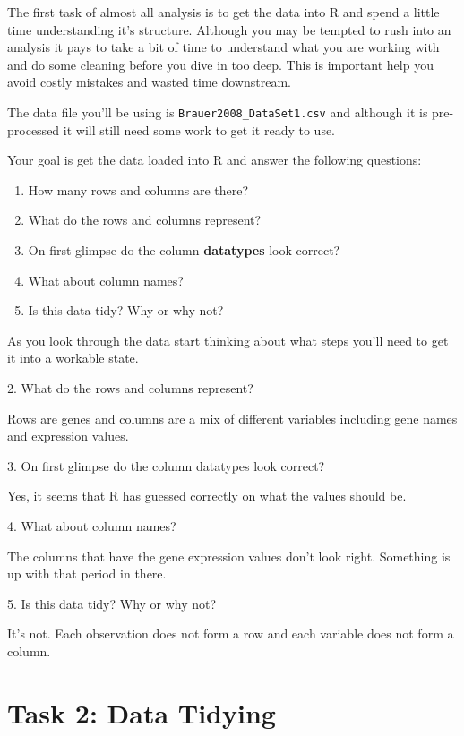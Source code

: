 \documentclass[
]{book}
\providecommand{\tightlist}{%
  \setlength{\itemsep}{0pt}\setlength{\parskip}{0pt}}
\begin{document}
The first task of almost all analysis is to get the data into R and spend a little time understanding it's structure. Although you may be tempted to rush into an analysis it pays to take a bit of time to understand what you are working with and do some cleaning before you dive in too deep. This is important help you avoid costly mistakes and wasted time downstream.

The data file you'll be using is \texttt{Brauer2008\_DataSet1.csv} and although it is pre-processed it will still need some work to get it ready to use.

Your goal is get the data loaded into R and answer the following questions:

\begin{enumerate}
\def\labelenumi{\arabic{enumi}.}
\tightlist
\item
  How many rows and columns are there?
\item
  What do the rows and columns represent?
\item
  On first glimpse do the column \textbf{datatypes} look correct?
\item
  What about column names?
\item
  Is this data tidy? Why or why not?
\end{enumerate}

As you look through the data start thinking about what steps you'll need to get it into a workable state.

2. What do the rows and columns represent?

Rows are genes and columns are a mix of different variables including gene names and expression values.

3. On first glimpse do the column datatypes look correct?

Yes, it seems that R has guessed correctly on what the values should be.

4. What about column names?

The columns that have the gene expression values don't look right. Something is up with that period in there.

5. Is this data tidy? Why or why not?

It's not. Each observation does not form a row and each variable does not form a column.

\section*{Task 2: Data Tidying}\label{task-2-data-tidying}
\end{document}
